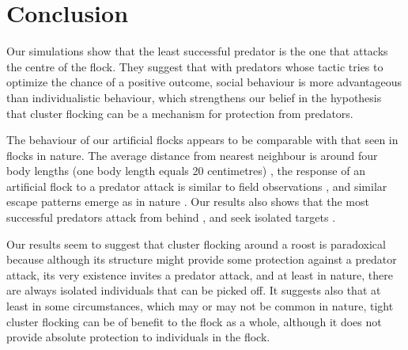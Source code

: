 \section{Conclusion}

Our simulations show that the least successful predator is the one that attacks the centre of the flock. They suggest that with predators whose tactic tries to optimize the chance of a positive outcome, social behaviour is more advantageous than individualistic behaviour, which strengthens our belief in the hypothesis that cluster flocking can be a mechanism for protection from predators.

The behaviour of our artificial flocks appears to be comparable with that seen in flocks in nature. The average distance from nearest neighbour is around four body lengths (one body length equals 20 centimetres) \cite{ballerini2008empirical,major1978three,pomeroy1992structure}, the response of an artificial flock to a predator attack is similar to field observations \cite{lee2006dynamics}, and similar escape patterns emerge as in nature \cite{pitcher1983predator}. Our results also shows that the most successful predators attack from behind \cite{handegard2012dynamics}, and seek isolated targets \cite{ioannou2012predatory}.

Our results seem to suggest that cluster flocking around a roost is paradoxical because although its structure might provide some protection against a predator attack, its very existence invites a predator attack, and at least in nature, there are always isolated individuals that can be picked off. It suggests also that at least in some circumstances, which may or may not be common in nature, tight cluster flocking can be of benefit to the flock as a whole, although it does not provide absolute protection to individuals in the flock.


